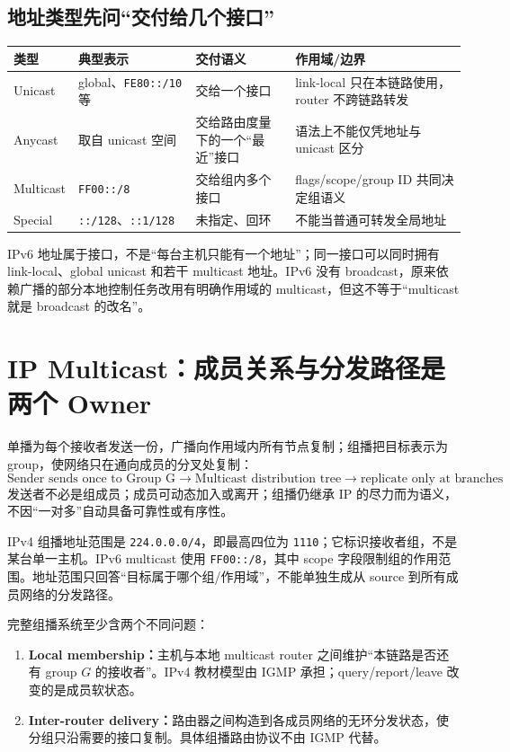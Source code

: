 \documentclass[11pt,a4paper]{ctexart}
\newcommand{\kw}[1]{\textbf{\color{deep}#1}}
\newcommand{\code}[1]{\texttt{#1}}
\begin{document}
\subsection{地址类型先问“交付给几个接口”}

\begin{center}\small
\begin{tabularx}{\linewidth}{L{2.1cm}L{2.7cm}Y Y}
\toprule
类型 & 典型表示 & 交付语义 & 作用域/边界\\
\midrule
Unicast & global、\code{FE80::/10} 等 & 交给一个接口 & link-local 只在本链路使用，router 不跨链路转发\\
Anycast & 取自 unicast 空间 & 交给路由度量下的一个“最近”接口 & 语法上不能仅凭地址与 unicast 区分\\
Multicast & \code{FF00::/8} & 交给组内多个接口 & flags/scope/group ID 共同决定组语义\\
Special & \code{::/128}、\code{::1/128} & 未指定、回环 & 不能当普通可转发全局地址\\
\bottomrule
\end{tabularx}
\end{center}

IPv6 地址属于接口，不是“每台主机只能有一个地址”；同一接口可以同时拥有 link-local、global unicast 和若干 multicast 地址。IPv6 没有 broadcast，原来依赖广播的部分本地控制任务改用有明确作用域的 multicast，但这不等于“multicast 就是 broadcast 的改名”。

\section{IP Multicast：成员关系与分发路径是两个 Owner}

单播为每个接收者发送一份，广播向作用域内所有节点复制；组播把目标表示为 group，使网络只在通向成员的分叉处复制：
\[
\boxed{
\text{Sender sends once to Group G}
\to\text{Multicast distribution tree}
\to\text{replicate only at branches}
}.
\]
发送者不必是组成员；成员可动态加入或离开；组播仍继承 IP 的尽力而为语义，不因“一对多”自动具备可靠性或有序性。

IPv4 组播地址范围是 \code{224.0.0.0/4}，即最高四位为 \code{1110}；它标识接收者组，不是某台单一主机。IPv6 multicast 使用 \code{FF00::/8}，其中 scope 字段限制组的作用范围。地址范围只回答“目标属于哪个组/作用域”，不能单独生成从 source 到所有成员网络的分发路径。

完整组播系统至少含两个不同问题：
\begin{enumerate}
  \item \kw{Local membership：}主机与本地 multicast router 之间维护“本链路是否还有 group $G$ 的接收者”。IPv4 教材模型由 IGMP 承担；query/report/leave 改变的是成员软状态。
  \item \kw{Inter-router delivery：}路由器之间构造到各成员网络的无环分发状态，使分组只沿需要的接口复制。具体组播路由协议不由 IGMP 代替。
\end{enumerate}
\end{document}
